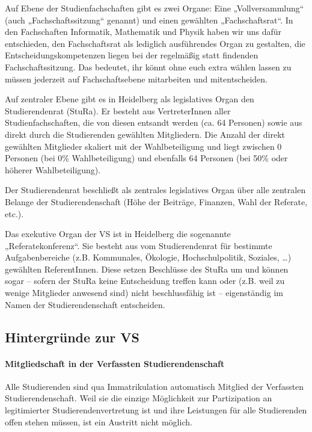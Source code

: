Auf Ebene der Studienfachschaften gibt es zwei Organe: Eine „Vollversammlung“
(auch „Fachschaftssitzung“ genannt) und einen gewählten „Fachschaftsrat“. In
den Fachschaften Informatik, Mathematik und Physik haben wir uns dafür
entschieden, den Fachschaftsrat als lediglich ausführendes Organ zu gestalten,
die Entscheidungskompetenzen liegen bei der regelmäßig statt findenden
Fachschaftssitzung.  Das bedeutet, ihr könnt ohne euch extra wählen lassen zu
müssen jederzeit auf Fachschaftsebene mitarbeiten und mitentscheiden.

Auf zentraler Ebene gibt es in Heidelberg als legislatives Organ den
Studierendenrat (StuRa).  Er besteht aus VertreterInnen aller
Studienfachschaften, die von diesen entsandt werden (ca. 64 Personen) sowie aus
direkt durch die Studierenden gewählten Mitgliedern.  Die Anzahl der direkt
gewählten Mitglieder skaliert mit der Wahlbeteiligung und liegt zwischen 0
Personen (bei 0\% Wahlbeteiligung) und ebenfalls 64 Personen (bei 50\% oder
höherer Wahlbeteiligung).

Der Studierendenrat beschließt als zentrales legislatives Organ über alle
zentralen Belange der Studierendenschaft (Höhe der Beiträge, Finanzen,
Wahl der Referate, etc.).

Das exekutive Organ der VS ist in Heidelberg die sogenannte
„Referatekonferenz“.  Sie besteht aus vom Studierendenrat für bestimmte
Aufgabenbereiche (z.B.  Kommunales, Ökologie, Hochschulpolitik, Soziales,
\dots) gewählten ReferentInnen. Diese setzen Beschlüsse des StuRa um und können
sogar -- sofern der StuRa keine Entscheidung treffen kann oder (z.B. weil zu
wenige Mitglieder anwesend sind) nicht beschlussfähig ist -- eigenständig im
Namen der Studierendenschaft entscheiden.

\subsection{Hintergründe zur VS}

\paragraph{Mitgliedschaft in der Verfassten Studierendenschaft}

Alle Studierenden sind qua Immatrikulation automatisch Mitglied der Verfassten
Studierendenschaft. Weil sie die einzige Möglichkeit zur Partizipation an
legitimierter Studierendenvertretung ist und ihre Leistungen für alle
Studierenden offen stehen müssen, ist ein Austritt nicht möglich.

